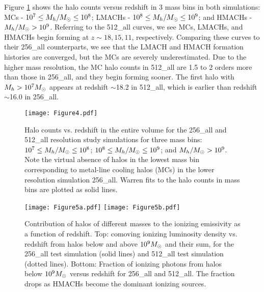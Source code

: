 \documentclass[iop,apj]{emulateapj}
\begin{document}
Figure \ref{256_512_halos} shows the halo counts versus redshift in 3 mass bins in both simulations: MCs - $10^7 \leq M_h/M_{\odot} \leq  10^8$; LMACHs - $10^8 \leq M_h/M_{\odot}  \leq 10^9$; and HMACHs - $M_h/M_{\odot} > 10^9$. 
Referring to the 512\_all curves, we see MCs, LMACHs, and HMACHs begin forming at $z \sim18, 15, 11$, respectively. Comparing these curves to their 256\_all counterparts, we see that the LMACH and HMACH formation histories are converged, but the MCs are severely underestimated. 
Due to the higher mass resolution, the MC halo counts in 512\_all are 1.5 to 2 orders more than those in 256\_all, and they begin forming sooner. The first halo with $M_h>10^7M_\odot$ appears at redshift $\sim$18.2 in 512\_all, which is earlier than redshift $\sim$16.0 in 256\_all. 

\begin{figure}
\texttt{[image: Figure4.pdf]}
\caption{Halo counts vs. redshift in the entire volume for the 256\_all and 512\_all resolution study simulations for three mass bins: $10^7 \leq M_h/M_{\odot} \leq  10^8$; $10^8 \leq M_h/M_{\odot}  \leq 10^9$; and $M_h/M_{\odot} > 10^9$. Note the virtual absence of halos in the lowest mass bin corresponding to metal-line cooling halos (MCs) in the lower resolution simulation 256\_all. Warren fits to the halo counts in mass bins are plotted as solid lines.  }
\label{256_512_halos}
\end{figure}

\begin{figure}
\texttt{[image: Figure5a.pdf]}
\texttt{[image: Figure5b.pdf]}
\caption{Contribution of halos of different masses to the ionizing emissivity as a function of redshift. Top: comoving ionizing luminosity density vs. redshift from halos below and above $10^9\Ms$ and their sum, for the 256\_all test simulation (solid lines) and 512\_all test simulation (dotted lines). Bottom:  Fraction of ionizing photons from halos below $10^9\Ms$ versus redshift for 256\_all and 512\_all. The fraction drops as HMACHs become the dominant ionizing sources.}
\label{256_512_emis_frac}
\end{figure}
\end{document}

